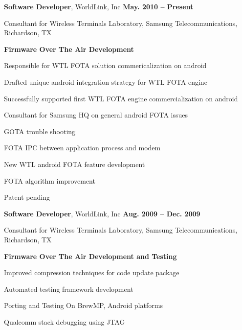 \documentclass[overlapped, line]{resume}
\begin{document}
\begin{resume}
         {\bf Software Developer}, WorldLink, Inc \hfill {\bf May. 2010 -- Present}\\
         \vspace{-10pt}      %
         \begin{list2}
         \item Consultant for Wireless Terminals Laboratory, Samsung Telecommunications, Richardson, TX
         \item \textbf{Firmware Over The Air Development}
           \begin{list2}
           \item Responsible for WTL FOTA solution commericalization on android
           \begin{list2}
             \item Drafted unique android integration strategy for WTL FOTA engine
             \item Successfully supported first WTL FOTA engine commercialization on android
           \end{list2}
           \item Consultant for Samsung HQ on general android FOTA issues
           \begin{list2}
           \item GOTA trouble shooting
           \item FOTA IPC between application process and modem
           \end{list2}
           \item New WTL android FOTA feature development
           \item FOTA algorithm improvement
           \begin{list2}
           \item Patent pending
           \end{list2}
           \end{list2}
         \end{list2}  \vspace{-5pt}

         {\bf Software Developer}, WorldLink, Inc \hfill {\bf Aug. 2009 -- Dec. 2009}\\
         \vspace{-10pt}      %
         \begin{list2}
         \item Consultant for Wireless Terminals Laboratory, Samsung Telecommunications, Richardson, TX
         \item \textbf{Firmware Over The Air Development and Testing}
           \begin{list2}
           \item Improved compression techniques for code update package
           \item Automated testing framework development
           \item Porting and Testing On BrewMP, Android platforms
           \item Qualcomm stack debugging using JTAG
           \end{list2}


\end{list2}
\end{resume}
\end{document}
